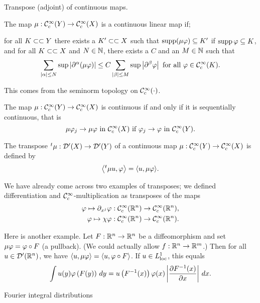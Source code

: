 Transpose (adjoint) of continuous maps.

\begin{defn}
  The map $\mu: \mathcal{C}_c^\infty(Y) \to \mathcal{C}_c^\infty(X)$ is a continuous linear map if;
  \begin{enum}
    \io for all $K\subset\subset Y$ there exists a $K'\subset\subset X$ such that $\operatorname{supp}(\mu\varphi)\subseteq K'$ if $\operatorname{supp}\varphi\subseteq K$, and
    \io for all $K\subset\subset X$ and $N\in\mathbb{N}$, there exists a $C$ and an $M\in\mathbb{N}$ such that
    \[ \sum_{\left\lvert \alpha \right\rvert\leq N} \sup\left\lvert \partial^\alpha(\mu\varphi) \right\rvert \leq C \sum_{\left\lvert \beta \right\rvert\leq M} \sup\left\lvert \partial^\beta\varphi \right\rvert \text{ for all } \varphi\in\mathcal{C}_c^\infty(K). \]
  \end{enum}
\end{defn}
This comes from the seminorm topology on $\mathcal{C}_c^\infty(\cdot)$.

\begin{exer}
  The map $\mu: \mathcal{C}_c^\infty(Y) \to \mathcal{C}_c^\infty(X)$ is continuous if and only if it is sequentially continuous, that is
  \[ \mu\varphi_j\to\mu\varphi \text{ in } \mathcal{C}_c^\infty(X) \text{ if } \varphi_j\to\varphi \text{ in } \mathcal{C}_c^\infty(Y). \]
\end{exer}

\begin{defn}
  The transpose ${}^t\mu: \mathcal{D}'(X) \to \mathcal{D}'(Y)$ of a continuous map $\mu: \mathcal{C}_c^\infty(Y) \to \mathcal{C}_c^\infty(X)$ is defined by
  \[ {\left\langle  {}^t\mu u,\varphi \right\rangle} = {\left\langle u,\mu\varphi \right\rangle}. \]
\end{defn}

\begin{exam}
  We have already come across two examples of transposes; we defined differentiation and $\mathcal{C}_c^\infty$-multiplication as transposes of the maps
  \begin{align*}
    \varphi\mapsto\partial_{x^j}\varphi&: \mathcal{C}_c^\infty(\mathbb{R}^n) \to \mathcal{C}_c^\infty(\mathbb{R}^n), \\
    \varphi\mapsto \chi\varphi&: \mathcal{C}_c^\infty(\mathbb{R}^n) \to \mathcal{C}_c^\infty(\mathbb{R}^n).
  \end{align*}
  
  Here is another example.
  Let $F:\mathbb{R}^n\to\mathbb{R}^n$ be a diffeomorphism and set $\mu\varphi=\varphi\circ F$ (a pullback).
  (We could actually allow $f:\mathbb{R}^n\to\mathbb{R}^m$.)
  Then for all $u\in\mathcal{D}'(\mathbb{R}^n)$, we have ${\left\langle u,\mu\varphi \right\rangle}={\left\langle u,\varphi\circ F \right\rangle}$.
  If $u\in L_{\operatorname{loc}}^1$, this equals
  \[ \int u(y) \varphi\left( F(y) \right)\, dy = u\left( F^{-1}(x) \right)\varphi(x) \left\lvert \frac{\partial F^{-1}(x)}{\partial x} \right\rvert\, dx. \]
\end{exam}

Fourier integral distributions

